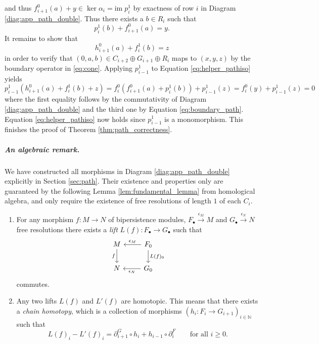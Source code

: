 \documentclass[a4paper,UKenglish,cleveref,nolineno,autoref]{socg-lipics-v2021}
\newcommand{\define}[1]{\emph{#1}} %
\newcommand{\im}{\mathrm{im}\;}
\begin{document}
and thus $f^0_{i+1}(a)+y\in \ker \alpha_i = \im p^1_i$ by exactness of row $i$ in Diagram \eqref{diag:app_path_double}. Thus there exists a $b\in R_i$ such that
\begin{equation*}
    p^1_i(b)+f^0_{i+1}(a)=y.
\end{equation*}
It remains to show that 
\begin{equation}
    \label{eq:helper_pathiso}
    h^0_{i+1}(a)+f^1_i(b)=z
\end{equation}
in order to verify that $(0,a,b)\in C_{i+2}\oplus G_{i+1}\oplus R_{i}$ maps to $(x,y,z)$ by the boundary operator in \eqref{eq:cone}. Applying $p^1_{i-1}$ to Equation \eqref{eq:helper_pathiso} yields
\begin{equation*}
    p^1_{i-1}(h^0_{i+1}(a)+f^1_i(b)+z)=f^0_i(f^0_{i+1}(a)+p^1_i(b))+p^1_{i-1}(z) =                       f^0_i(y)+p^1_{i-1}(z) =0
\end{equation*}
where the first equality follows by the commutativity of Diagram \eqref{diag:app_path_double} and the third one by Equation \eqref{eq:boundary_path}. Equation \eqref{eq:helper_pathiso} now holds since $p^1_{i-1}$ is a monomorphism. This finishes the proof of Theorem \ref{thm:path_correctness}. 

\subparagraph{An algebraic remark.}

We have constructed all morphisms in Diagram \eqref{diag:app_path_double} explicitly in Section \ref{sec:path}. Their existence and properties only are guaranteed by the following Lemma \ref{lem:fundamental_lemma} from homological algebra, and only require the existence of free resolutions of length $1$ of each $C_i$.
\begin{lemma}
    \label{lem:fundamental_lemma}
    \begin{enumerate}[label=(\roman*)]
        \item For any morphism $f:M\rightarrow N$ of bipersistence modules, $F_\bullet\xrightarrow{\epsilon_M} M$ and $G_\bullet \xrightarrow{\epsilon_N} N$ free resolutions there exists a \define{lift} $L(f):F_\bullet \rightarrow G_\bullet$ such that 
        \begin{equation*}
            \begin{tikzcd}
M \arrow[d, "f"'] & F_0 \arrow[l, "\epsilon_M"'] \arrow[d, "L(f)_0"] \\
N                 & G_0 \arrow[l, "\epsilon_N"]                     
\end{tikzcd}
        \end{equation*}
        commutes. 
        \item Any two lifts $L(f)$ and $L'(f)$ are homotopic. This means that there exists a \define{chain homotopy}, which is a collection of morphisms $(h_i:F_i\rightarrow G_{i+1})_{i\in \mathbb{N}}$ such that 
        \begin{equation*}
        L(f)_i-L'(f)_i=\partial^G_{i+1}\circ h_i+h_{i-1}\circ \partial^F_i \qquad \text{for all }i\geq 0.
        \end{equation*}
    \end{enumerate} 
\end{lemma}
\end{document}
